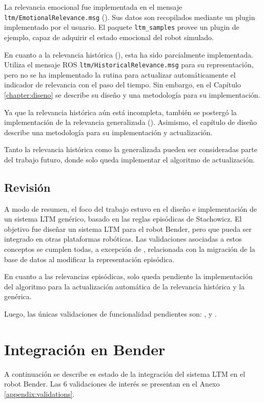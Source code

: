 La relevancia emocional fue implementada en el mensaje \texttt{ltm/EmotionalRelevance.msg} (). Sus datos son recopilados mediante un plugin implementado por el usuario. El paquete \texttt{ltm\_samples} provee un plugin de ejemplo, capaz de adquirir el estado emocional del robot simulado.

En cuanto a la relevancia histórica (), esta ha sido parcialmente implementada. Utiliza el mensaje ROS \texttt{ltm/HistoricalRelevance.msg} para su representación, pero no se ha implementado la rutina para actualizar automáticamente el indicador de relevancia con el paso del tiempo. Sin embargo, en el Capítulo \ref{chapter:diseno} se describe su diseño y una metodología para su implementación.

Ya que la relevancia histórica aún está incompleta, también se postergó la implementación de la relevancia generalizada (). Asimismo, el capítulo de diseño describe una metodología para su implementación y actualización.

Tanto la relevancia histórica como la generalizada pueden ser consideradas parte del trabajo futuro, donde solo queda implementar el algoritmo de actualización.


\subsection{Revisión}

A modo de resumen, el foco del trabajo estuvo en el diseño e implementación de un sistema LTM genérico, basado en las reglas episódicas de Stachowicz. El objetivo fue diseñar un sistema LTM para el robot Bender, pero que pueda ser integrado en otras plataformas robóticas. Las validaciones asociadas a estos conceptos se cumplen todas, a excepción de , relacionada con la migración de la base de datos al modificar la representación episódica.

En cuanto a las relevancias episódicas, solo queda pendiente la implementación del algoritmo para la actualización automática de la relevancia histórica y la genérica.

Luego, las únicas validaciones de funcionalidad pendientes son: ,  y .


\section{Integración en Bender}

A continuación se describe es estado de la integración del sistema LTM en el robot Bender. Las 6 validaciones de interés se presentan en el Anexo \ref{appendix:validations}.

